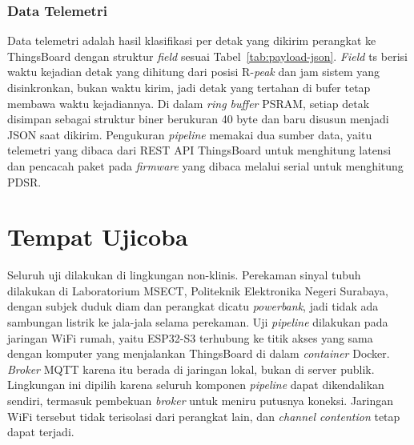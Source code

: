 
\subsubsection{Data Telemetri}

Data telemetri adalah hasil klasifikasi per detak yang dikirim perangkat ke ThingsBoard dengan struktur \textit{field} sesuai Tabel~\ref{tab:payload-json}. \textit{Field} ts berisi waktu kejadian detak yang dihitung dari posisi R-\textit{peak} dan jam sistem yang disinkronkan, bukan waktu kirim, jadi detak yang tertahan di bufer tetap membawa waktu kejadiannya. Di dalam \textit{ring buffer} PSRAM, setiap detak disimpan sebagai struktur biner berukuran 40 byte dan baru disusun menjadi JSON saat dikirim. Pengukuran \textit{pipeline} memakai dua sumber data, yaitu telemetri yang dibaca dari REST API ThingsBoard untuk menghitung latensi dan pencacah paket pada \textit{firmware} yang dibaca melalui serial untuk menghitung PDSR.

\section{Tempat Ujicoba}

Seluruh uji dilakukan di lingkungan non-klinis. Perekaman sinyal tubuh dilakukan di Laboratorium MSECT, Politeknik Elektronika Negeri Surabaya, dengan subjek duduk diam dan perangkat dicatu \textit{powerbank}, jadi tidak ada sambungan listrik ke jala-jala selama perekaman. Uji \textit{pipeline} dilakukan pada jaringan WiFi rumah, yaitu ESP32-S3 terhubung ke titik akses yang sama dengan komputer yang menjalankan ThingsBoard di dalam \textit{container} Docker. \textit{Broker} MQTT karena itu berada di jaringan lokal, bukan di server publik. Lingkungan ini dipilih karena seluruh komponen \textit{pipeline} dapat dikendalikan sendiri, termasuk pembekuan \textit{broker} untuk meniru putusnya koneksi. Jaringan WiFi tersebut tidak terisolasi dari perangkat lain, dan \textit{channel contention} tetap dapat terjadi.

